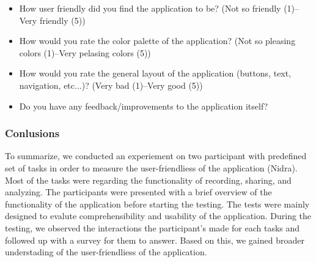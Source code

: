 \begin{itemize}
    \item How user friendly did you find the application to be? (Not so friendly (1)--Very friendly (5))
    \item How would you rate the color palette of the application? (Not so pleasing colors (1)--Very pelasing colors (5))
    \item How would you rate the general layout of the application (buttons, text, navigation, etc...)? (Very bad (1)--Very good (5))
    \item Do you have any feedback/improvements to the application itself?
    \begin{description}[font=\normalfont\itshape]
        \item[Participent A:]
        \item[Participent B:] 
    \end{description}
\end{itemize}


\subsubsection{Conlusions}

To summarize, we conducted an experiement on two participant with predefined set of tasks in order to measure the user-friendliess of the application (Nidra). Most of the tasks were regarding the functionality of recording, sharing, and analyzing. The participants were presented with a brief overview of the functionality of the application before starting the testing. The tests were mainly designed to evalute comprehensibility and usability of the application. During the testing, we observed the interactions the participant's made for each tasks and followed up with a survey for them to answer. Based on this, we gained broader understading of the user-friendliess of the application.

